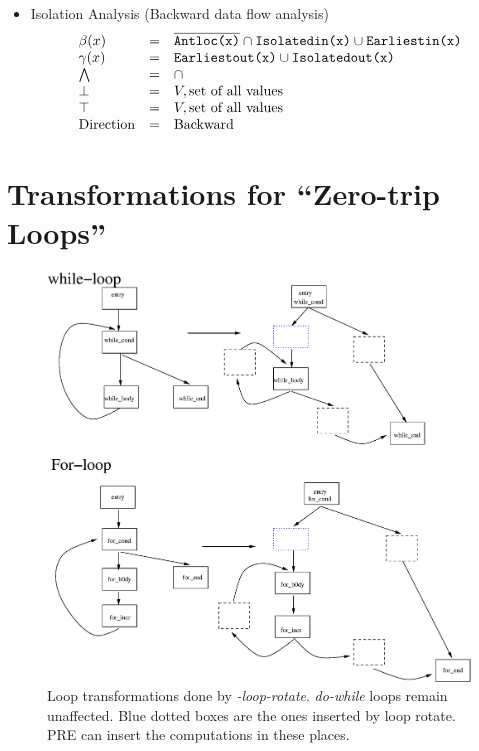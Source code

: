 \begin{itemize}
\item Isolation Analysis (Backward data flow analysis)
\begin{equation}
\begin{array}{l c l}
\beta(x)      &=& \overline{\texttt{Antloc(x)}} \cap \texttt{Isolatedin(x)} \cup \texttt{Earliestin(x)}     \\     
\gamma(x)   &=& \texttt{Earliestout(x)} \cup \texttt{Isolatedout(x)} \\
\bigwedge     &=&  \cap \\
\bot          &=& V, \text{set of all values} \\
\top          &=& V, \text{set of all values} \\
\text{Direction}    &=& \text{Backward}
\end{array}
\end{equation}

\end{itemize}

\chapter{Transformations for ``Zero-trip Loops''}

\begin{figure}[htbp]
  \begin{center}
     \includegraphics[scale=0.5]{Figs/5} 
  \end{center}
  \caption{Loop transformations done by \emph{-loop-rotate}. \emph{do-while}
    loops remain unaffected. Blue dotted boxes are the ones inserted by loop
      rotate. PRE can insert the computations in these places.}
  \label{fig:5} 
  \end{figure}


